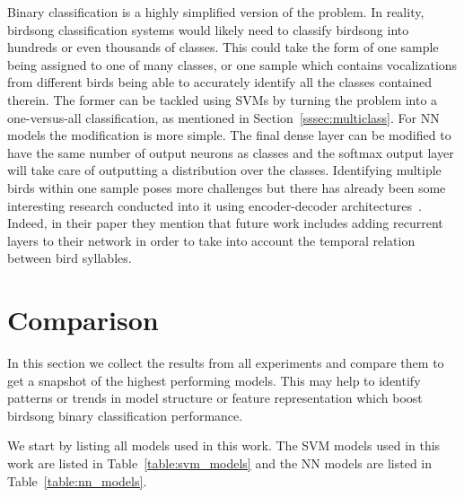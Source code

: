 Binary classification is a highly simplified version of the problem. In reality,
birdsong classification systems would likely need to classify birdsong into
hundreds or even thousands of classes. This could take the form of one sample
being assigned to one of many classes, or one sample which contains
vocalizations from different birds being able to accurately identify all the
classes contained therein. The former can be tackled using SVMs by turning the
problem into a one-versus-all classification, as mentioned in
Section~\ref{sssec:multiclass}. For NN models the modification is more simple.
The final dense layer can be modified to have the same number of output neurons
as classes and the softmax output layer will take care of outputting a
distribution over the classes. Identifying multiple birds within one sample
poses more challenges but there has already been some interesting research
conducted into it using encoder-decoder
architectures~\cite{narasimhan2017simultaneous}. Indeed, in their paper they
mention that future work includes adding recurrent layers to their network in
order to take into account the temporal relation between bird syllables.

\section{Comparison}

In this section we collect the results from all experiments and compare them to
get a snapshot of the highest performing models. This may help to identify
patterns or trends in model structure or feature representation which boost
birdsong binary classification performance.

We start by listing all models used in this work. The SVM models used in this
work are listed in Table~\ref{table:svm_models} and the NN models are listed in
Table~\ref{table:nn_models}.

